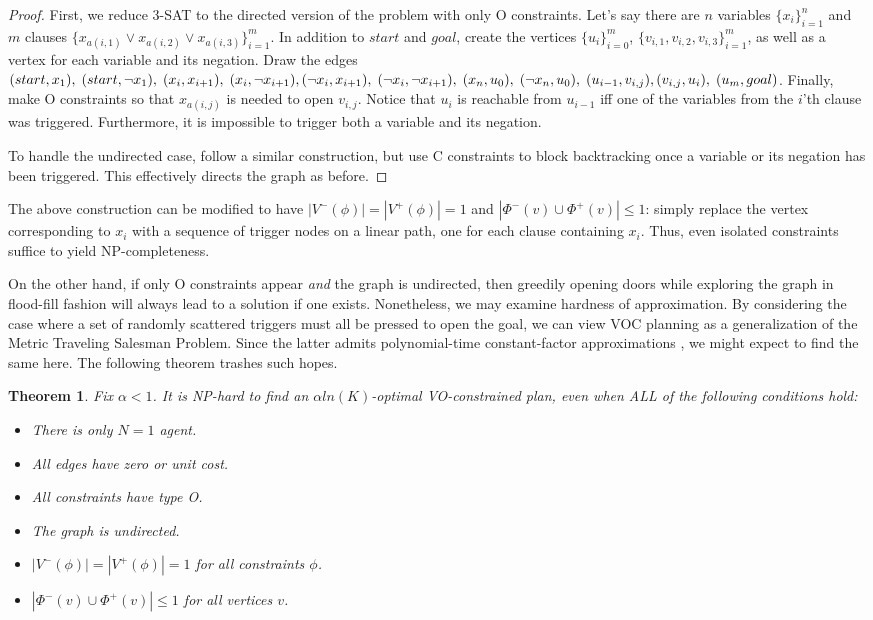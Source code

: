 \documentclass[letterpaper]{article}
\newtheorem{thm}{Theorem}
\begin{document}
\begin{proof}
First, we reduce 3-SAT to the directed version of the problem with only O constraints. Let's say there are $n$ variables $\{x_i\}_{i=1}^n$ and $m$ clauses $\{x_{a(i,1)} \vee x_{a(i,2)} \vee x_{a(i,3)} \}_{i=1}^m$. In addition to $start$ and $goal$, create the vertices $\{u_i\}_{i=0}^m$, $\{v_{i,1},v_{i,2},v_{i,3}\}_{i=1}^m$, as well as a vertex for each variable and its negation. Draw the edges
$(start,x_1),\;(start,\neg x_1),\;(x_i,x_{i+1}),\;(x_i,\neg x_{i+1}),\;
\\(\neg x_i,x_{i+1}),\;(\neg x_i,\neg x_{i+1}),\;(x_n,u_0),\;(\neg x_n,u_0),\;(u_{i-1},v_{i,j}),\;
\\(v_{i,j},u_i),\;(u_m,goal)$.
Finally, make O constraints so that $x_{a(i,j)}$ is needed to open $v_{i,j}$. Notice that $u_i$ is reachable from $u_{i-1}$ iff one of the variables from the $i$'th clause was triggered. Furthermore, it is impossible to trigger both a variable and its negation.

To handle the undirected case, follow a similar construction, but use C constraints to block backtracking once a variable or its negation has been triggered. This effectively directs the graph as before.
\end{proof}

The above construction can be modified to have $|V^-(\phi)| = |V^+(\phi)| = 1$ and $|\Phi^-(v) \cup \Phi^+(v)| \le 1$: simply replace the vertex corresponding to $x_i$ with a sequence of trigger nodes on a linear path, one for each clause containing $x_i$. Thus, even isolated constraints suffice to yield NP-completeness.

On the other hand, if only O constraints appear \emph{and} the graph is undirected, then greedily opening doors while exploring the graph in flood-fill fashion will always lead to a solution if one exists. Nonetheless, we may examine hardness of approximation. By considering the case where a set of randomly scattered triggers must all be pressed to open the goal, we can view VOC planning as a generalization of the Metric Traveling Salesman Problem. Since the latter admits polynomial-time constant-factor approximations \cite{christofides1976worst}, we might expect to find the same here. The following theorem trashes such hopes.

\begin{thm}
\label{thm:NP2}
Fix $\alpha < 1$. It is NP-hard to find an $\alpha ln(K)$-optimal VO-constrained plan, even when ALL of the following conditions hold:
\begin{itemize}
\item There is only $N=1$ agent.
\item All edges have zero or unit cost.
\item All constraints have type O.
\item The graph is undirected.
\item $|V^-(\phi)| = |V^+(\phi)| = 1$ for all constraints $\phi$.
\item $|\Phi^-(v) \cup \Phi^+(v)| \le 1$ for all vertices $v$.
\end{itemize}
\end{thm}
\end{document}
